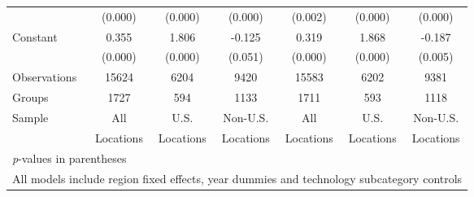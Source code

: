 \begin{table}[htbp]
\begin{tabular}{l*{6}{c}}
                &  (0.000)&  (0.000)&  (0.000)&  (0.002)&  (0.000)&  (0.000)\\
Constant        &    0.355&    1.806&   -0.125&    0.319&    1.868&   -0.187\\
                &  (0.000)&  (0.000)&  (0.051)&  (0.000)&  (0.000)&  (0.005)\\
\hline
Observations    &    15624&     6204&     9420&    15583&     6202&     9381\\
Groups          &     1727&      594&     1133&     1711&      593&     1118\\
Sample&All &U.S. &Non-U.S.&All &U.S. &Non-U.S. \\
          &Locations &Locations&Locations&Locations &Locations&Locations\\
\hline\hline
\multicolumn{7}{l}{\footnotesize \textit{p}-values in parentheses}\\
\multicolumn{7}{l}{\footnotesize All models include region fixed effects, year dummies and technology subcategory controls}\\
\end{tabular}
\end{table}
